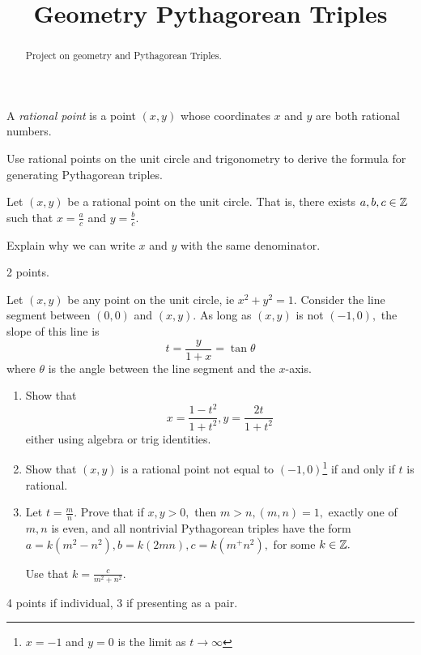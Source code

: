 \documentclass[letterpaper, 11 pt]{ximera}
\title{Geometry Pythagorean Triples}
\begin{document}
\begin{abstract}
 Project on geometry and Pythagorean Triples.
\end{abstract}
\maketitle


\begin{exploration}
 \begin{definition}
 	A \emph{rational point} is a point $(x,y)$ whose coordinates $x$ and $y$ are both rational numbers.
\end{definition}

Use rational points on the unit circle and trigonometry to derive the formula for generating Pythagorean triples. 

\begin{problem}\label{prob:rational-form}
 	Let $(x,y)$ be a rational point on the unit circle. That is, there exists $a,b,c\in\mathbb Z$ such that $x=\frac{a}{c}$ and $y=\frac{b}{c}$.
	
	Explain why we can write $x$ and $y$ with the same denominator.
\begin{rubric}
 2 points.
\end{rubric}
\end{problem}

\begin{problem}
Let $(x,y)$ be any point on the unit circle, ie $x^2+y^2=1.$
	Consider the line segment between $(0,0)$ and $(x,y).$ As long as $(x,y)$ is not $(-1,0),$ the slope of this line is \[t=\frac{y}{1+x}=\tan\theta\] where $\theta$ is the angle between the line segment and the $x$-axis. 
	\begin{enumerate}
 		\item Show that \[x=\frac{1-t^2}{1+t^2}, y=\frac{2t}{1+t^2}\] either using algebra or trig identities.
		\item Show that $(x,y)$ is a rational point not equal to $(-1,0)$\footnote{$x=-1$ and $y=0$ is the limit as $t\to\infty$} if and only if $t$ is rational.
		\item Let $t=\frac{m}{n}.$ Prove that if $x,y>0,$ then $m>n, (m,n)=1,$ exactly one of $m,n$ is even, and all nontrivial Pythagorean triples have the form $a=k(m^2-n^2), b=k(2mn), c=k(m^+n^2),$ for some $k\in\mathbb Z.$ 
\begin{hint}
Use that $k=\frac{c}{m^2+n^2}$.
\end{hint}
 
	\end{enumerate}
\begin{rubric}
 4 points if individual, 3 if presenting as a pair.
\end{rubric}
\end{problem}

\end{exploration}
\end{document}
